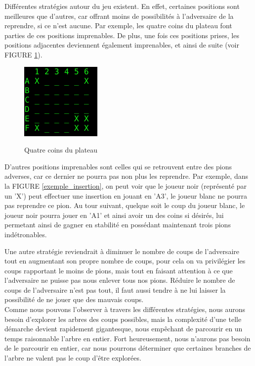 \documentclass[10pt,a4paper]{article}
\begin{document}
Différentes stratégies autour du jeu existent. En effet, certaines positions sont meilleures que d'autres, car offrant moins de possibilités à l'adversaire de la reprendre, si ce n'est aucune. Par exemple, les quatre coins du plateau font parties de ces positions imprenables. De plus, une fois ces positions prises, les positions adjacentes deviennent également imprenables, et ainsi de suite (voir FIGURE \ref{bord_stable}).

\begin{figure}[H]
\centering
\includegraphics[scale=0.8]{images/bord_stable.png}
\label{bord_stable}
\caption{Quatre coins du plateau}
\end{figure}

D'autres positions imprenables sont celles qui se retrouvent entre des pions adverses, car ce dernier ne pourra pas non plus les reprendre. Par exemple, dans la FIGURE \ref{exemple_insertion}, on peut voir que le joueur noir (représenté par un 'X') peut effectuer une insertion en jouant en 'A3', le joueur blanc ne pourra pas reprendre ce pion. Au tour suivant, quelque soit le coup du joueur blanc, le joueur noir pourra jouer en 'A1' et ainsi avoir un des coins si désirés, lui permetant ainsi de gagner en stabilité en possédant maintenant trois pions indétronables.

Une autre stratégie reviendrait à diminuer le nombre de coups de l'adversaire tout en augmentant son propre nombre de coups, pour cela on va privilégier les coups rapportant le moins de pions, mais tout en faisant attention à ce que l'adversaire ne puisse pas nous enlever tous nos pions. Réduire le nombre de coups de l'adversaire n'est pas tout, il faut aussi tendre à ne lui laisser la possibilité de ne jouer que des mauvais coups.\\

Comme nous pouvons l'observer à travers les différentes stratégies, nous aurons besoin d'explorer les arbres des coups possibles, mais la complexité d'une telle démarche devient rapidement gigantesque, nous empêchant de parcourir en un temps raisonnable l'arbre en entier. Fort heureusement, nous n'aurons pas besoin de le parcourir en entier, car nous pourrons déterminer que certaines branches de l'arbre ne valent pas le coup d'être explorées.
\end{document}
